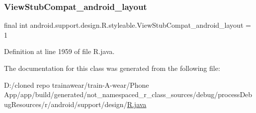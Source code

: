 \subsubsection{\texorpdfstring{ViewStubCompat\_android\_layout}{ViewStubCompat\_android\_layout}}
{\footnotesize\ttfamily final int android.\+support.\+design.\+R.\+styleable.\+View\+Stub\+Compat\+\_\+android\+\_\+layout = 1\hspace{0.3cm}{\ttfamily [static]}}



Definition at line 1959 of file R.\+java.



The documentation for this class was generated from the following file\+:\begin{DoxyCompactItemize}
\item 
D\+:/cloned repo trainawear/train-\/\+A-\/wear/\+Phone App/app/build/generated/not\+\_\+namespaced\+\_\+r\+\_\+class\+\_\+sources/debug/process\+Debug\+Resources/r/android/support/design/\mbox{\hyperlink{process_debug_resources_2r_2android_2support_2design_2_r_8java}{R.\+java}}\end{DoxyCompactItemize}
